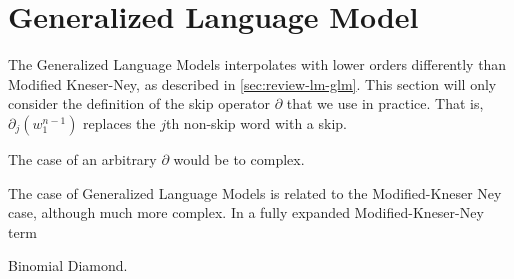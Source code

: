 
\section{Generalized Language Model}

The Generalized Language Models interpolates with lower orders differently
than Modified Kneser-Ney, as described in \cref{sec:review-lm-glm}.
This section will only consider the definition of the skip operator
$\partial$ that we use in practice.
That is, $\partial_j(w_1^{n-1})$ replaces the $j$th non-skip word with a skip.
\begin{draft}
The  case of an arbitrary $\partial$ would be to complex.
\end{draft}

The case of Generalized Language Models is related to the Modified-Kneser Ney
case, although much more complex.
In a fully expanded Modified-Kneser-Ney term

\begin{draft}
Binomial Diamond.
\end{draft}

